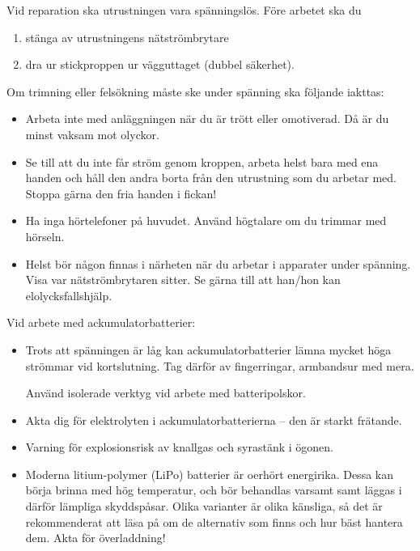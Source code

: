 \noindent
Vid reparation ska utrustningen vara spänningslös.
Före arbetet ska du

\begin{enumerate}
  \item stänga av utrustningens nätströmbrytare
  \item dra ur stickproppen ur vägguttaget (dubbel säkerhet).
\end{enumerate}

\noindent
Om trimning eller felsökning måste ske under spänning ska följande iakttas:
\begin{itemize}
\item Arbeta inte med anläggningen när du är trött eller omotiverad.
  Då är du minst vaksam mot olyckor.
\item Se till att du inte får ström genom kroppen, arbeta helst bara med ena
  handen och håll den andra borta från den utrustning som du arbetar med.
  Stoppa gärna den fria handen i fickan!
\item Ha inga hörtelefoner på huvudet.
  Använd högtalare om du trimmar med hörseln.
\item Helst bör någon finnas i närheten när du arbetar i apparater under
  spänning.
  Visa var nätströmbrytaren sitter.
  Se gärna till att han/hon kan elolycksfallshjälp.
\end{itemize}

\noindent
Vid arbete med ackumulatorbatterier:

\begin{itemize}
\item Trots att spänningen är låg kan ackumulatorbatterier lämna
  mycket höga strömmar vid kortslutning.
  Tag därför av fingerringar, armbandsur med mera.

Använd isolerade verktyg vid arbete med batteripolskor.
\item Akta dig för elektrolyten i ackumulatorbatterierna -- den är
  starkt frätande.
\item Varning för explosionsrisk av knallgas och syrastänk i ögonen.
\item Moderna litium-polymer (LiPo) batterier är oerhört energirika.
  Dessa kan börja brinna med hög temperatur, och bör behandlas varsamt samt
  läggas i därför lämpliga skyddspåsar.
  Olika varianter är olika känsliga, så det är rekommenderat att läsa på om
  de alternativ som finns och hur bäst hantera dem.
  Akta för överladdning!
\end{itemize}
